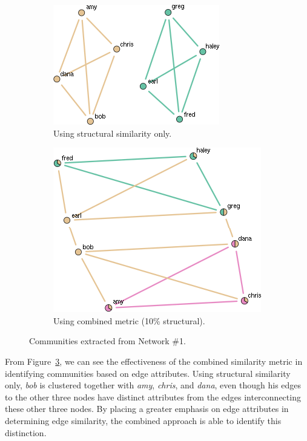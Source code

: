\documentclass{report} %
\begin{document}
\begin{figure}[htp!]
  \centering
  \begin{subfigure}{.5\textwidth}
    \centering
    \includegraphics[width=.8\linewidth]{toy2/no_ea/edge_comm.png}
    \caption{Using structural similarity only.}
    \label{fig:net1_comm_struct}
  \end{subfigure}%
  \begin{subfigure}{.5\textwidth}
    \centering
    \includegraphics[width=.9\linewidth]{toy2/ea/edge_comm_0.1.png}
    \caption{Using combined metric (10\% structural).}
    \label{fig:net1_comm_both_10}
  \end{subfigure}
  \caption{Communities extracted from Network \#1.}
  \label{fig:net1_comm}
\end{figure}

From Figure~\ref{fig:net1_comm}, we can see the effectiveness of the combined similarity metric in identifying communities based on edge attributes. Using structural similarity only, \textit{bob} is clustered together with \textit{amy}, \textit{chris}, and \textit{dana}, even though his edges to the other three nodes have distinct attributes from the edges interconnecting these other three nodes. By placing a greater emphasis on edge attributes in determining edge similarity, the combined approach is able to identify this distinction.\\
\end{document}
